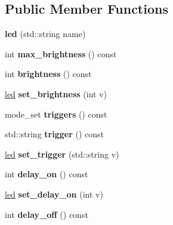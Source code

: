\subsection*{Public Member Functions}
\begin{DoxyCompactItemize}
\item 
\mbox{\label{classev3dev_1_1led_a9afe507add06d74f3f67821dc680f5a6}} 
{\bfseries led} (std\+::string name)
\item 
\mbox{\label{classev3dev_1_1led_af4ae01ee9937f97ff37ebea3dc34ee22}} 
int {\bfseries max\+\_\+brightness} () const
\item 
\mbox{\label{classev3dev_1_1led_a6157e68493bcd27d83ac8a412e3d9488}} 
int {\bfseries brightness} () const
\item 
\mbox{\label{classev3dev_1_1led_a9add520d16289968fb6d4c2883d7a42d}} 
\hyperlink{classev3dev_1_1led}{led} {\bfseries set\+\_\+brightness} (int v)
\item 
\mbox{\label{classev3dev_1_1led_ae7746353eb1f923658b8b90f644ae68c}} 
mode\+\_\+set {\bfseries triggers} () const
\item 
\mbox{\label{classev3dev_1_1led_a3419d7fbe8287f1dd1151fca36ca09e7}} 
std\+::string {\bfseries trigger} () const
\item 
\mbox{\label{classev3dev_1_1led_ae708a30c0d92a73295465099831ea322}} 
\hyperlink{classev3dev_1_1led}{led} {\bfseries set\+\_\+trigger} (std\+::string v)
\item 
\mbox{\label{classev3dev_1_1led_a9768d65e46b5f4809627158ab8d3e004}} 
int {\bfseries delay\+\_\+on} () const
\item 
\mbox{\label{classev3dev_1_1led_a962f65b0183856d78536bd1f722598d1}} 
\hyperlink{classev3dev_1_1led}{led} {\bfseries set\+\_\+delay\+\_\+on} (int v)
\item 
\mbox{\label{classev3dev_1_1led_a333147d15f3d3a1cfb69ebfb3c3307e7}} 
int {\bfseries delay\+\_\+off} () const

\end{DoxyCompactItemize}
